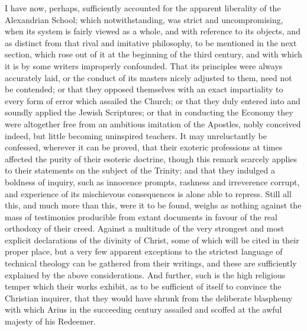 I have now, perhaps, sufficiently accounted for the apparent
liberality of the Alexandrian School; which notwithstanding, was
strict and uncompromising, when its system is fairly viewed as a
whole, and with reference to its objects, and as distinct from that
rival and imitative philosophy, to be mentioned in the next section,
which rose out of it at the beginning of the third century, and with
which it is by some writers improperly confounded. That its principles
were always accurately laid, or the conduct of its masters nicely
adjusted to them, need not be contended; or that they opposed
themselves with an exact impartiality to every form of error which
assailed the Church; or that they duly entered into and soundly
applied the Jewish Scriptures; or that in conducting the Economy they
were altogether free from an ambitious imitation of the Apostles,
nobly conceived indeed, but little becoming uninspired teachers. It
may unreluctantly be confessed, wherever it can be proved, that their
exoteric professions at times affected the purity of their esoteric
doctrine, though this remark scarcely applies to their statements on
the subject of the Trinity; and that they indulged a boldness of
inquiry, such as innocence prompts, rashness and irreverence corrupt,
and experience of its mischievous consequences is alone able to
repress. Still all this, and much more than this, were it to be found,
weighs as nothing against the mass of testimonies producible from
extant documents in favour of the real orthodoxy of their creed.
Against a multitude of the very strongest and most explicit
declarations of the divinity of Christ, some of which will be cited in
their proper place, but a very few apparent exceptions to the
strictest language of technical theology can be gathered from their
writings, and these are sufficiently explained by the above
considerations. And further, such is the high religious temper which
their works exhibit, as to be sufficient of itself to convince the
Christian inquirer, that they would have shrunk from the deliberate
blasphemy with which Arius in the succeeding century assailed and
scoffed at the awful majesty of his Redeemer.

